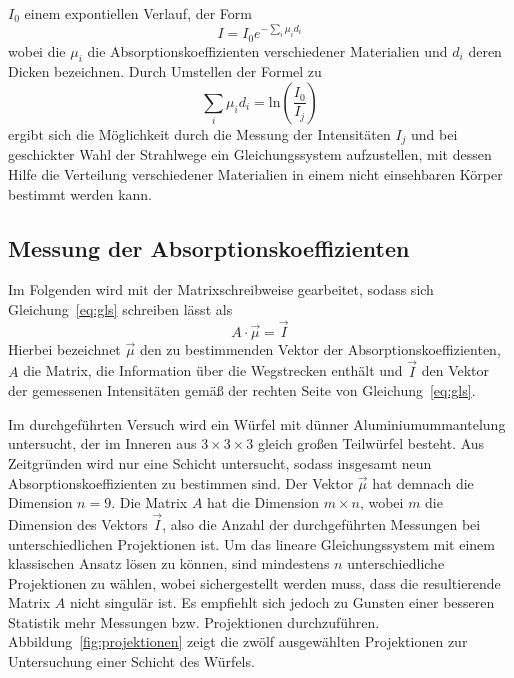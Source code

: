 $I_0$ einem expontiellen Verlauf, der Form
\begin{equation}
  I=I_0e^{-\sum_i\mu_id_i}
\end{equation}
wobei die $\mu_i$ die Absorptionskoeffizienten verschiedener Materialien und
$d_i$ deren Dicken bezeichnen. Durch Umstellen der Formel zu
\begin{equation}
  \sum_i\mu_id_i=\text{ln}\left(\frac{I_0}{I_j}\right)
  \label{eq:gls}
\end{equation}
ergibt sich die Möglichkeit durch die Messung der Intensitäten $I_j$ und bei
geschickter Wahl der Strahlwege ein Gleichungssystem aufzustellen, mit dessen
Hilfe die Verteilung verschiedener Materialien in einem nicht einsehbaren Körper
bestimmt werden kann.

\subsection{Messung der Absorptionskoeffizienten}
Im Folgenden wird mit der Matrixschreibweise gearbeitet, sodass sich
Gleichung~\eqref{eq:gls} schreiben lässt als
\begin{equation}
  A\cdot\vec{\mu}=\vec{I}
  \label{eq:gls_matrix}
\end{equation}
Hierbei bezeichnet $\vec{\mu}$ den zu bestimmenden Vektor der
Absorptionskoeffizienten, $A$ die Matrix, die Information über die Wegstrecken
enthält und $\vec{I}$ den Vektor der gemessenen Intensitäten gemäß der rechten
Seite von Gleichung~\eqref{eq:gls}.

Im durchgeführten Versuch wird ein Würfel mit dünner Aluminiumummantelung
untersucht, der im Inneren aus $3\times3\times3$ gleich großen Teilwürfel
besteht. Aus Zeitgründen wird nur eine Schicht untersucht, sodass insgesamt neun
Absorptionskoeffizienten zu bestimmen sind. Der Vektor $\vec{\mu}$ hat demnach
die Dimension $n=9$. Die Matrix $A$ hat die Dimension $m\times n$, wobei $m$ die
Dimension des Vektors $\vec{I}$, also die Anzahl der durchgeführten Messungen
bei unterschiedlichen Projektionen ist. Um das lineare Gleichungssystem mit
einem klassischen Ansatz lösen zu können, sind mindestens $n$ unterschiedliche
Projektionen zu wählen, wobei sichergestellt werden muss, dass die resultierende
Matrix $A$ nicht singulär ist. Es empfiehlt sich jedoch zu Gunsten einer
besseren Statistik mehr Messungen bzw. Projektionen durchzuführen.
Abbildung~\ref{fig:projektionen} zeigt die zwölf ausgewählten Projektionen zur
Untersuchung einer Schicht des Würfels.

